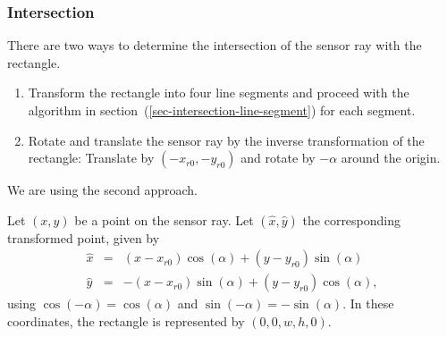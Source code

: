 \documentclass[11pt]{article}
\newcommand{\xhat}{{\hat{x}}}
\newcommand{\yhat}{{\hat{y}}}
\begin{document}
\subsubsection*{Intersection}
There are two ways to determine the intersection of the sensor ray with the
rectangle.
\begin{enumerate}
    \item Transform the rectangle into four line segments and
        proceed with the algorithm in
        section~(\ref{sec-intersection-line-segment}) for each segment.
    \item Rotate and translate the sensor ray by the inverse transformation of
        the rectangle: Translate by $(-x_{r0}, -y_{r0})$ and rotate by 
        $-\alpha$ around the origin. 
\end{enumerate}
We are using the second approach.

Let $(x, y)$ be a point on the sensor ray. Let $(\xhat, \yhat)$ the
corresponding transformed point, given by
\begin{eqnarray}
    \xhat &=& (x - x_{r0}) \cos(\alpha) + (y - y_{r0}) \sin(\alpha) \\
    \yhat &=& - (x - x_{r0}) \sin(\alpha) + (y - y_{r0}) \cos(\alpha),
\end{eqnarray}
using $\cos(-\alpha)=\cos(\alpha)$ and $\sin(-\alpha)=-\sin(\alpha)$. In these
coordinates, the rectangle is represented by $(0, 0, w, h, 0)$.
\end{document}
